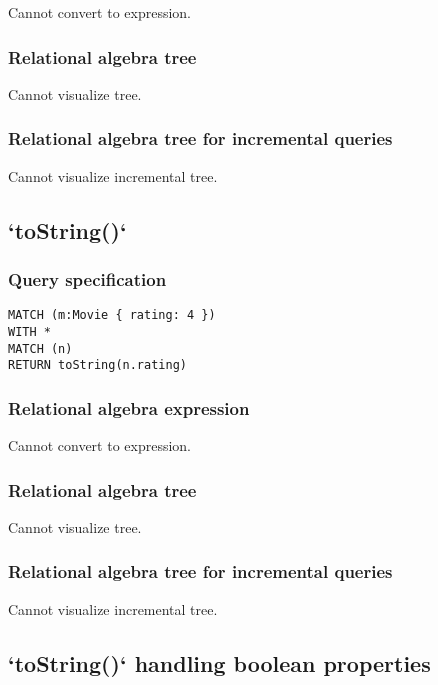 Cannot convert to expression.

\subsubsection*{Relational algebra tree}

Cannot visualize tree.

\subsubsection*{Relational algebra tree for incremental queries}

Cannot visualize incremental tree.

\subsection{`toString()`}

\subsubsection*{Query specification}

\begin{lstlisting}
MATCH (m:Movie { rating: 4 })
WITH *
MATCH (n)
RETURN toString(n.rating)
\end{lstlisting}

\subsubsection*{Relational algebra expression}

Cannot convert to expression.

\subsubsection*{Relational algebra tree}

Cannot visualize tree.

\subsubsection*{Relational algebra tree for incremental queries}

Cannot visualize incremental tree.

\subsection{`toString()` handling boolean properties}

